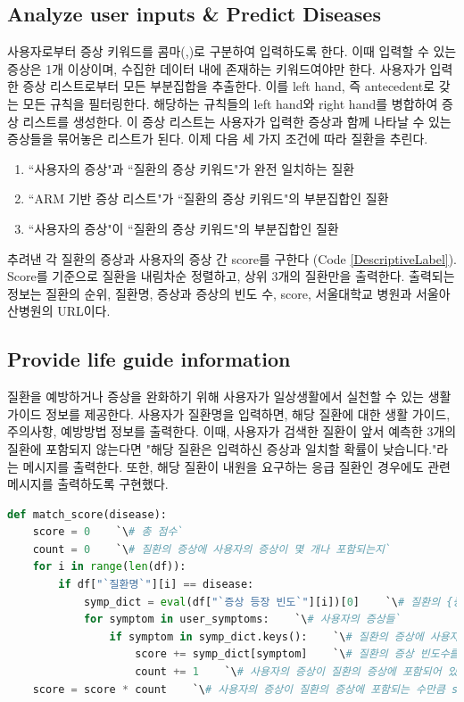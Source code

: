 \documentclass[conference]{IEEEtran}
\begin{document}
\subsection{Analyze user inputs \& Predict Diseases}
사용자로부터 증상 키워드를 콤마(,)로 구분하여 입력하도록 한다. 이때 입력할 수 있는 증상은 1개 이상이며, 수집한 데이터 내에 존재하는 키워드여야만 한다. 사용자가 입력한 증상 리스트로부터 모든 부분집합을 추출한다. 이를 left hand, 즉 antecedent로 갖는 모든 규칙을 필터링한다. 해당하는 규칙들의 left hand와 right hand를 병합하여 증상 리스트를 생성한다. 이 증상 리스트는 사용자가 입력한 증상과 함께 나타날 수 있는 증상들을 묶어놓은 리스트가 된다.
이제 다음 세 가지 조건에 따라 질환을 추린다.
\begin{enumerate}
    \item ``사용자의 증상"과 ``질환의 증상 키워드"가 완전 일치하는 질환
    \item ``ARM 기반 증상 리스트"가 ``질환의 증상 키워드"의 부분집합인 질환
    \item ``사용자의 증상"이 ``질환의 증상 키워드"의 부분집합인 질환
\end{enumerate}
추려낸 각 질환의 증상과 사용자의 증상 간 score를 구한다 (Code \ref{DescriptiveLabel}). Score를 기준으로 질환을 내림차순 정렬하고, 상위 3개의 질환만을 출력한다. 출력되는 정보는 질환의 순위, 질환명, 증상과 증상의 빈도 수, score, 서울대학교 병원과 서울아산병원의 URL이다.
\subsection{Provide life guide information}
질환을 예방하거나 증상을 완화하기 위해 사용자가 일상생활에서 실천할 수 있는 생활 가이드 정보를 제공한다. 사용자가 질환명을 입력하면, 해당 질환에 대한 생활 가이드, 주의사항, 예방방법 정보를 출력한다. 이때, 사용자가 검색한 질환이 앞서 예측한 3개의 질환에 포함되지 않는다면 "해당 질환은 입력하신 증상과 일치할 확률이 낮습니다."라는 메시지를 출력한다. 또한, 해당 질환이 내원을 요구하는 응급 질환인 경우에도 관련 메시지를 출력하도록 구현했다.
\begin{strip}
\begin{lstlisting}[label=DescriptiveLabel, frame=tb, escapeinside=``, language=Python]
def match_score(disease):
    score = 0    `\# 총 점수`
    count = 0    `\# 질환의 증상에 사용자의 증상이 몇 개나 포함되는지`
    for i in range(len(df)):
        if df["`질환명`"][i] == disease:
            symp_dict = eval(df["`증상 등장 빈도`"][i])[0]    `\# 질환의 {증상: 빈도수} 딕셔너리`
            for symptom in user_symptoms:    `\# 사용자의 증상들`
                if symptom in symp_dict.keys():    `\# 질환의 증상에 사용자의 증상이 있으면`
                    score += symp_dict[symptom]    `\# 질환의 증상 빈도수를 score에 더함`
                    count += 1    `\# 사용자의 증상이 질환의 증상에 포함되어 있으므로 count += 1`
    score = score * count    `\# 사용자의 증상이 질환의 증상에 포함되는 수만큼 score에 곱함`
\end{lstlisting}
\end{strip}
\end{document}
